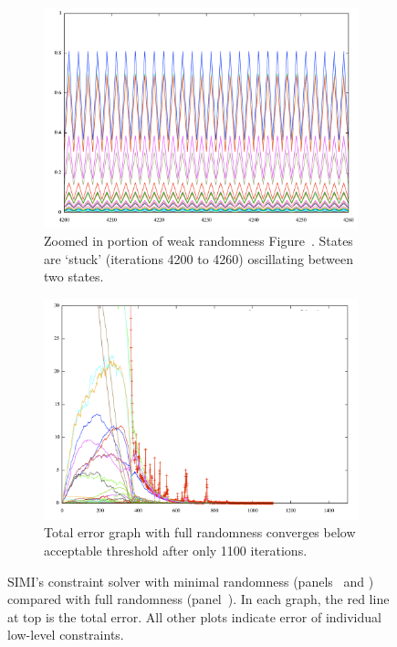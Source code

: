 \begin{landscape}
\begin{figure}
  \begin{subfigure}[t]{0.44\textwidth}
    \centering
    \includegraphics[width=\linewidth]{img/jessica-norandom-closeup.pdf}
    \caption{Zoomed in portion of weak randomness
      Figure~. States are `stuck'
      (iterations 4200 to 4260) oscillating between two states.}
    \label{fig:jessica-closeup}
  \end{subfigure}
  \hspace{0.03\textwidth}
  \begin{subfigure}[t]{0.44\textwidth}
    \centering
    \includegraphics[width=\linewidth]{img/jessica-with-fullrandom.png}
    \caption{Total error graph with full randomness converges below
      acceptable threshold after only 1100 iterations.}
    \label{fig:jessica-fullrandom}
  \end{subfigure}
  \caption[Constraint Solver Minimal vs. Full Randomness]{SIMI's
    constraint solver with minimal randomness
    (panels~\textit{} and
    \textit{}) compared with full
    randomness (panel~\textit{}). In
    each graph, the red line at top is the total error. All other
    plots indicate error of individual low-level constraints.}
  \label{fig:jessica}
\end{figure}
\end{landscape}
